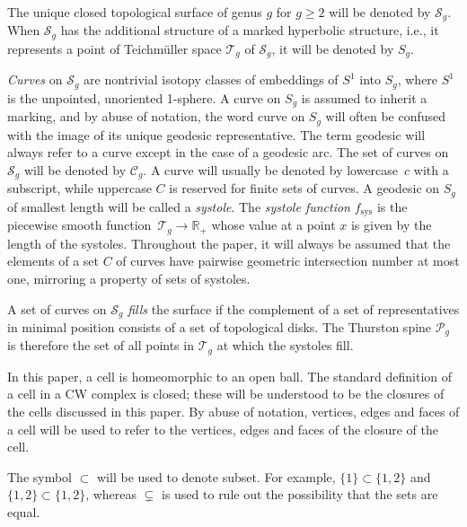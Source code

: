 \documentclass[11pt]{article}
\numberwithin{equation}{section}
\numberwithin{equation}{section}
\begin{document}
The unique closed topological surface of genus $g$ for $g\geq 2$ will be denoted by $\mathcal{S}_{g}$. When $\mathcal{S}_{g}$ has the additional structure of a marked hyperbolic structure, i.e., it represents a point of Teichm\"uller space $\mathcal{T}_{g}$ of $\mathcal{S}_{g}$, it will be denoted by $S_{g}$.

\textit{Curves} on $\mathcal{S}_{g}$ are nontrivial isotopy classes of embeddings of $S^{1}$ into $S_{g}$, where $S^{1}$ is the unpointed, unoriented 1-sphere. A curve on $S_{g}$ is assumed to inherit a marking, and by abuse of notation, the word curve on $S_{g}$ will often be confused with the image of its unique geodesic representative. The term geodesic will always refer to a curve except in the case of a geodesic arc. The set of curves on $\mathcal{S}_{g}$ will be denoted by $\mathcal{C}_{g}$. A curve will usually be denoted by lowercase~$c$ with a subscript, while uppercase $C$ is reserved for finite sets of curves. A geodesic on $S_{g}$ of smallest length will be called a \textit{systole}. The \textit{systole function} $f_{\mathrm{sys}}$ is the piecewise smooth function~${\mathcal{T}_{g}\rightarrow \mathbb{R}_{+}}$ whose value at a point $x$ is given by the length of the systoles. Throughout the paper, it will always be assumed that the elements of a set $C$ of curves have pairwise geometric intersection number at most one, mirroring a property of sets of systoles.

A set of curves on $\mathcal{S}_{g}$ \textit{fills} the surface if the complement of a set of representatives in minimal position consists of a set of topological disks. The Thurston spine $\mathcal{P}_{g}$ is therefore the set of all points in $\mathcal{T}_{g}$ at which the systoles fill.

In this paper, a cell is homeomorphic to an open ball. The standard definition of a cell in a CW complex is closed; these will be understood to be the closures of the cells discussed in this paper. By abuse of notation, vertices, edges and faces of a cell will be used to refer to the vertices, edges and faces of the closure of the cell.

The symbol $\subset$ will be used to denote subset. For example, $\{1\}\subset \{1,2\}$ and $\{1,2\}\subset \{1,2\}$, whereas $\subsetneq$ is used to rule out the possibility that the sets are equal.
\end{document}
